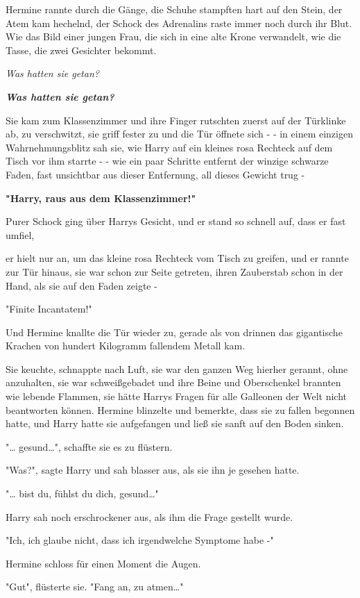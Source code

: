 {Hermine rannte durch die Gänge, die Schuhe stampften hart auf den Stein, der Atem kam hechelnd, der Schock des Adrenalins raste immer noch durch ihr Blut. Wie das Bild einer jungen Frau, die sich in eine alte Krone verwandelt, wie die Tasse, die zwei Gesichter bekommt.

\emph{Was hatten sie getan?}

\textbf{\emph{Was hatten sie getan?}}

Sie kam zum Klassenzimmer und ihre Finger rutschten zuerst auf der Türklinke ab, zu verschwitzt, sie griff fester zu und die Tür öffnete sich - - in einem einzigen Wahrnehmungsblitz sah sie, wie Harry auf ein kleines rosa Rechteck auf dem Tisch vor ihm starrte - - wie ein paar Schritte entfernt der winzige schwarze Faden, fast unsichtbar aus dieser Entfernung, all dieses Gewicht trug -

\textbf{"Harry, raus aus dem Klassenzimmer!"}

Purer Schock ging über Harrys Gesicht, und er stand so schnell auf, dass er fast umfiel,

er hielt nur an, um das kleine rosa Rechteck vom Tisch zu greifen, und er rannte zur Tür hinaus, sie war schon zur Seite getreten, ihren Zauberstab schon in der Hand, als sie auf den Faden zeigte -

"Finite Incantatem!"

Und Hermine knallte die Tür wieder zu, gerade als von drinnen das gigantische Krachen von hundert Kilogramm fallendem Metall kam.

Sie keuchte, schnappte nach Luft, sie war den ganzen Weg hierher gerannt, ohne anzuhalten, sie war schweißgebadet und ihre Beine und Oberschenkel brannten wie lebende Flammen, sie hätte Harrys Fragen für alle Galleonen der Welt nicht beantworten können. Hermine blinzelte und bemerkte, dass sie zu fallen begonnen hatte, und Harry hatte sie aufgefangen und ließ sie sanft auf den Boden sinken.

"… gesund…", schaffte sie es zu flüstern.

"Was?", sagte Harry und sah blasser aus, als sie ihn je gesehen hatte.

"… bist du, fühlst du dich, gesund…"

Harry sah noch erschrockener aus, als ihm die Frage gestellt wurde.

"Ich, ich glaube nicht, dass ich irgendwelche Symptome habe -"

Hermine schloss für einen Moment die Augen.

"Gut", flüsterte sie. "Fang an, zu atmen…"

}
